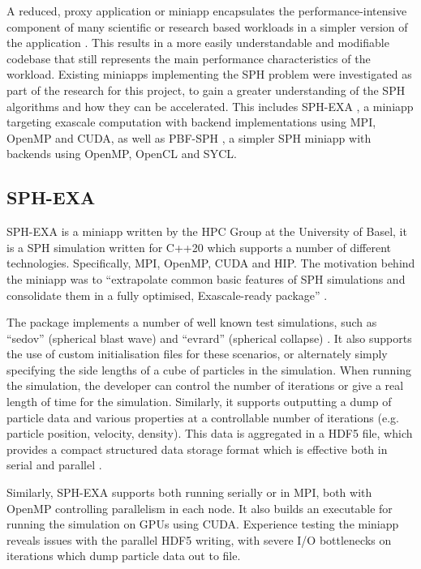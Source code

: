 A reduced, proxy application or miniapp encapsulates the performance-intensive component of many scientific or research based workloads in a simpler version of the application \cite{miniapps}. This results in a more easily understandable and modifiable codebase that still represents the main performance characteristics of the workload. Existing miniapps implementing the SPH problem were investigated as part of the research for this project, to gain a greater understanding of the SPH algorithms and how they can be accelerated. This includes SPH-EXA \cite{sphexa}, a miniapp targeting exascale computation with backend implementations using 
MPI, OpenMP and CUDA, as well as PBF-SPH \cite{pbfsph}, a simpler SPH miniapp with backends using OpenMP, OpenCL and SYCL.

\subsection{SPH-EXA}
SPH-EXA is a miniapp written by the HPC Group at the University of Basel, it is a SPH simulation written for C++20 which supports a number of different technologies. Specifically, MPI, OpenMP, CUDA and HIP. The motivation behind the miniapp was to ``extrapolate common basic features of SPH simulations and consolidate them in a fully optimised, Exascale-ready package'' \cite{sphexa}.

The package implements a number of well known test simulations, such as ``sedov'' (spherical blast wave) and ``evrard'' (spherical collapse) \cite{sedov, evrard, sphtests}. It also supports the use of custom initialisation files for these scenarios, or alternately simply specifying the side lengths of a cube of particles in the simulation. When running the simulation, the developer can control the number of iterations or give a real length of time for the simulation. Similarly, it supports outputting a dump of particle data and various properties at a controllable number of iterations (e.g. particle position, velocity, density). This data is aggregated in a HDF5 file, which provides a compact structured data storage format which is effective both in serial and parallel \cite{hdf5}.

Similarly, SPH-EXA supports both running serially or in MPI, both with OpenMP controlling parallelism in each node. It also builds an executable for running the simulation on GPUs using CUDA. Experience testing the miniapp reveals issues with the parallel HDF5 writing, with severe I/O bottlenecks on iterations which dump particle data out to file. %

